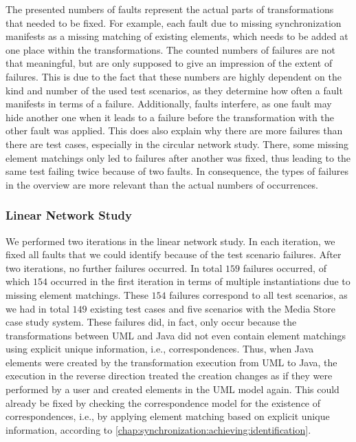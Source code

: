 The presented numbers of faults represent the actual parts of transformations that needed to be fixed.
For example, each fault due to missing synchronization manifests as a missing matching of existing elements, which needs to be added at one place within the transformations.
The counted numbers of failures are not that meaningful, but are only supposed to give an impression of the extent of failures.
This is due to the fact that these numbers are highly dependent on the kind and number of the used test scenarios, as they determine how often a fault manifests in terms of a failure.
Additionally, faults interfere, as one fault may hide another one when it leads to a failure before the transformation with the other fault was applied.
This does also explain why there are more failures than there are test cases, especially in the circular network study.
There, some missing element matchings only led to failures after another was fixed, thus leading to the same test failing twice because of two faults.
In consequence, the types of failures in the overview are more relevant than the actual numbers of occurrences.

\subsubsection*{Linear Network Study} 

We performed two iterations in the linear network study.
In each iteration, we fixed all faults that we could identify because of the test scenario failures.
After two iterations, no further failures occurred.
In total $159$ failures occurred, of which $154$ occurred in the first iteration in terms of multiple instantiations due to missing element matchings.
These $154$ failures correspond to all test scenarios, as we had in total $149$ existing test cases and five scenarios with the Media Store case study system.
These failures did, in fact, only occur because the transformations between \gls{UML} and Java did not even contain element matchings using explicit unique information, i.e., correspondences.
Thus, when Java elements were created by the transformation execution from \gls{UML} to Java, the execution in the reverse direction treated the creation changes as if they were performed by a user and created elements in the \gls{UML} model again.
This could already be fixed by checking the correspondence model for the existence of correspondences, i.e., by applying element matching based on explicit unique information, according to \autoref{chap:synchronization:achieving:identification}.

